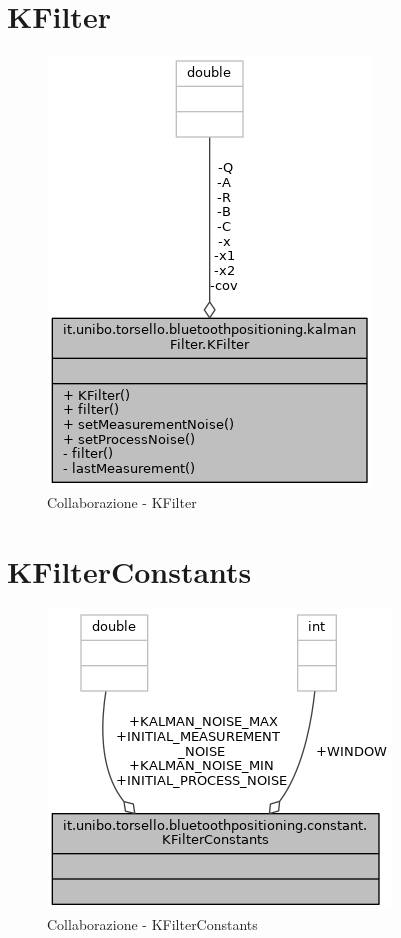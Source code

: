 \section{KFilter}
\begin{figure}[ph]
	\centering
	\includegraphics[width=0.6\linewidth]{img/uml/class/classit_1_1unibo_1_1torsello_1_1bluetoothpositioning_1_1kalmanFilter_1_1KFilter__coll__graph.png}
	\caption{Collaborazione - KFilter}
\end{figure}

\newpage
\section{KFilterConstants}
\begin{figure}[ph]
	\centering
	\includegraphics[width=0.6\linewidth]{img/uml/class/classit_1_1unibo_1_1torsello_1_1bluetoothpositioning_1_1constant_1_1KFilterConstants__coll__graph.png}
	\caption{Collaborazione - KFilterConstants}
\end{figure}

